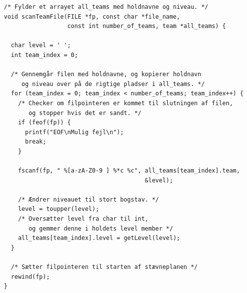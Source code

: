 \clearpage

\begin{source}
\begin{verbatim}
/* Fylder et arrayet all_teams med holdnavne og niveau. */
void scanTeamFile(FILE *fp, const char *file_name, 
                  const int number_of_teams, team *all_teams) {
                  
  char level = ' ';
  int team_index = 0;

  /* Gennemgår filen med holdnavne, og kopierer holdnavn 
     og niveau over på de rigtige pladser i all_teams. */
  for (team_index = 0; team_index < number_of_teams; team_index++) {
    /* Checker om filpointeren er kommet til slutningen af filen,
       og stopper hvis det er sandt. */
    if (feof(fp)) {
      printf("EOF\nMulig fejl\n");
      break;
    }

    fscanf(fp, " %[a-zA-Z0-9 ] %*c %c", all_teams[team_index].team, 
                                        &level);

    /* Ændrer niveauet til stort bogstav. */
    level = toupper(level);
    /* Oversætter level fra char til int, 
       og gemmer denne i holdets level member */
    all_teams[team_index].level = getLevel(level);
  }

  /* Sætter filpointeren til starten af stævneplanen */
  rewind(fp);
}
\end{verbatim}
\label{code:scanTeamFile}
\end{source}

\clearpage

